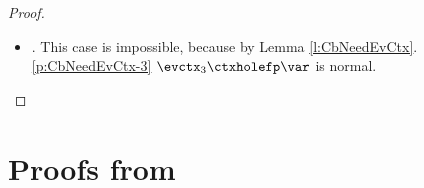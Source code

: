 \begin{proof}
\begin{itemize}
\begin{itemize}
 \item {}. This case is impossible, because by Lemma \ref{l:CbNeedEvCtx}.\ref{p:CbNeedEvCtx-3} $\evctx_3\ctxholefp\var$ is normal. \qedhere
 \end{itemize}
 \end{itemize}
 \end{proof}
 
 
  
   
    






























\section{Proofs from }
\label{sect:app-family}




